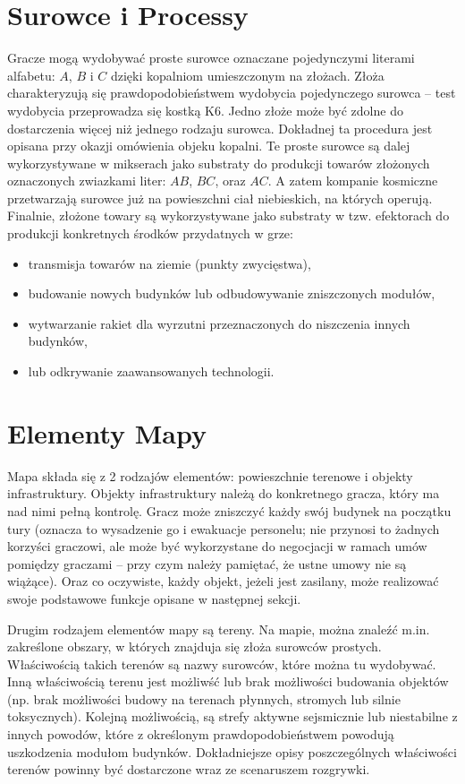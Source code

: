 \documentclass[11pt,a4paper]{article}
\begin{document}
\section{Surowce i Processy}

Gracze mogą wydobywać proste surowce oznaczane pojedynczymi literami alfabetu: $A$, $B$ i $C$ dzięki kopalniom umieszczonym na złożach. Złoża charakteryzują się prawdopodobieństwem wydobycia pojedynczego surowca -- test wydobycia przeprowadza się kostką K6. Jedno złoże może być zdolne do dostarczenia więcej niż jednego rodzaju surowca. Dokładnej ta procedura jest opisana przy okazji omówienia objeku kopalni. Te proste surowce są dalej wykorzystywane w mikserach jako substraty do produkcji towarów złożonych oznaczonych zwiazkami liter: $AB$, $BC$, oraz $AC$. A zatem kompanie kosmiczne przetwarzają surowce już na powieszchni ciał niebieskich, na których operują. Finalnie, złożone towary są wykorzystywane jako substraty w tzw. efektorach do produkcji konkretnych środków przydatnych w grze:
\begin{itemize}
  \setlength{\parskip}{0pt}
  \setlength{\itemsep}{0pt plus 1pt}
\item transmisja towarów na ziemie (punkty zwycięstwa),
\item budowanie nowych budynków lub odbudowywanie zniszczonych modułów,
\item wytwarzanie rakiet dla wyrzutni przeznaczonych do niszczenia innych budynków,
\item lub odkrywanie zaawansowanych technologii.
\end{itemize}

\section{Elementy Mapy}

Mapa składa się z 2 rodzajów elementów: powieszchnie terenowe i objekty infrastruktury. Objekty infrastruktury należą do konkretnego gracza, który ma nad nimi pełną kontrolę. Gracz może zniszczyć każdy swój budynek na początku tury (oznacza to wysadzenie go i ewakuacje personelu; nie przynosi to żadnych korzyści graczowi, ale może być wykorzystane do negocjacji w ramach umów pomiędzy graczami -- przy czym należy pamiętać, że ustne umowy nie są wiążące). Oraz co oczywiste, każdy objekt, jeżeli jest zasilany, może realizować swoje podstawowe funkcje opisane w następnej sekcji.  

Drugim rodzajem elementów mapy są tereny. Na mapie, można znaleźć m.in. zakreślone obszary, w których znajduja się złoża surowców prostych. Właściwością takich terenów są nazwy surowców, które można tu wydobywać. Inną właściwością terenu jest możliwść lub brak możliwości budowania objektów (np. brak możliwości budowy na terenach płynnych, stromych lub silnie toksycznych). Kolejną możliwością, są strefy aktywne sejsmicznie lub niestabilne z innych powodów, które z określonym prawdopodobieństwem powodują uszkodzenia modułom budynków. Dokładniejsze opisy poszczególnych właściwości terenów powinny być dostarczone wraz ze scenaruszem rozgrywki.
\end{document}
